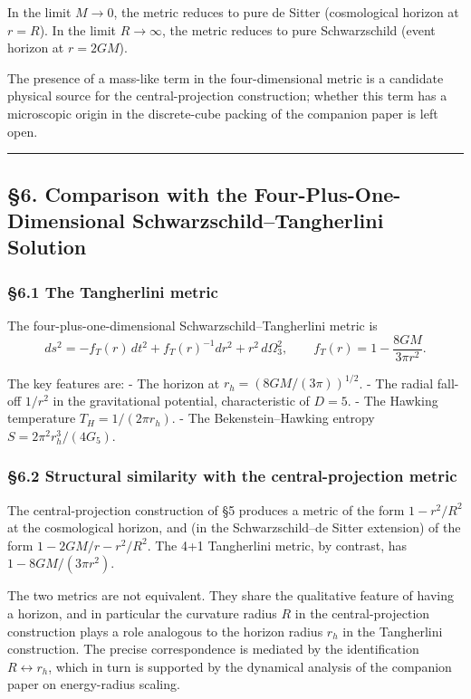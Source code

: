 \documentclass[a4paper,11pt]{article}
\theoremstyle{definition}
\begin{document}
In the limit \(M \to 0\), the metric reduces to pure de Sitter
(cosmological horizon at \(r = R\)). In the limit \(R \to \infty\), the
metric reduces to pure Schwarzschild (event horizon at \(r = 2GM\)).

The presence of a mass-like term in the four-dimensional metric is a
candidate physical source for the central-projection construction;
whether this term has a microscopic origin in the discrete-cube packing
of the companion paper is left open.

\begin{center}\rule{0.5\linewidth}{0.5pt}\end{center}

\subsection{§6. Comparison with the Four-Plus-One-Dimensional
Schwarzschild--Tangherlini
Solution}\label{comparison-with-the-four-plus-one-dimensional-schwarzschildtangherlini-solution}

\subsubsection{§6.1 The Tangherlini
metric}\label{the-tangherlini-metric}

The four-plus-one-dimensional Schwarzschild--Tangherlini metric is
\[ds^2 = -f_T(r)\, dt^2 + f_T(r)^{-1} dr^2 + r^2\, d\Omega_3^2, \qquad f_T(r) = 1 - \frac{8GM}{3\pi r^2}.\]

The key features are: - The horizon at \(r_h = (8GM/(3\pi))^{1/2}\). -
The radial fall-off \(1/r^2\) in the gravitational potential,
characteristic of \(D = 5\). - The Hawking temperature
\(T_H = 1/(2\pi r_h)\). - The Bekenstein--Hawking entropy
\(S = 2\pi^2 r_h^3/(4 G_5)\).

\subsubsection{§6.2 Structural similarity with the central-projection
metric}\label{structural-similarity-with-the-central-projection-metric}

The central-projection construction of §5 produces a metric of the form
\(1 - r^2/R^2\) at the cosmological horizon, and (in the
Schwarzschild--de Sitter extension) of the form \(1 - 2GM/r - r^2/R^2\).
The 4+1 Tangherlini metric, by contrast, has \(1 - 8GM/(3\pi r^2)\).

The two metrics are not equivalent. They share the qualitative feature
of having a horizon, and in particular the curvature radius \(R\) in the
central-projection construction plays a role analogous to the horizon
radius \(r_h\) in the Tangherlini construction. The precise
correspondence is mediated by the identification
\(R \leftrightarrow r_h\), which in turn is supported by the dynamical
analysis of the companion paper on energy-radius scaling.
\end{document}
